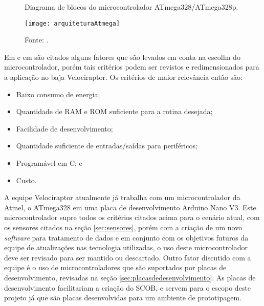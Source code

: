 \begin{figure}[!htb]
	\centering
		\caption{Diagrama de blocos do microcontrolador ATmega328/ATmega328p.}
		\texttt{[image: arquiteturaAtmega]} 
		\caption*{Fonte: \cite{atmel}.}
		\label{fig:arquiteturaAtmega}
\end{figure} 

Em  e em  são citados alguns fatores que são levados em conta na escolha do microcontrolador, porém tais critérios podem ser revistos e redimensionados para a aplicação no baja Velociraptor. Os critérios de maior relevância então são:

\begin{itemize}
	\item Baixo consumo de energia;
	\item Quantidade de RAM e ROM suficiente para a rotina desejada;
	\item Facilidade de desenvolvimento;
	\item Quantidade suficiente de entradas/saídas para periféricos; 
	\item Programável em C; e
	\item Custo.
\end{itemize}   

A equipe Velociraptor atualmente já trabalha com um microcontrolador da Atmel, o ATmega328 em uma placa de desenvolvimento Arduino Nano V3. Este microcontrolador supre todos os critérios citados acima para o cenário atual, com os sensores citados na seção \ref{sec:sensores}, porém com a criação de um novo \textit{software} para tratamento de dados e em conjunto com os objetivos futuros da equipe de atualizações nas tecnologia utilizadas, o uso deste microcontrolador deve ser revisado para ser mantido ou descartado. Outro fator discutido com a equipe é o uso de microcontroladores que são suportados por placas de desenvolvimento, revisadas na seção \ref{sec:placasdedesenvolvimento}. As placas de desenvolvimento facilitariam a criação do SCOB, e servem para o escopo deste projeto já que são placas desenvolvidas para um ambiente de prototipagem. 

